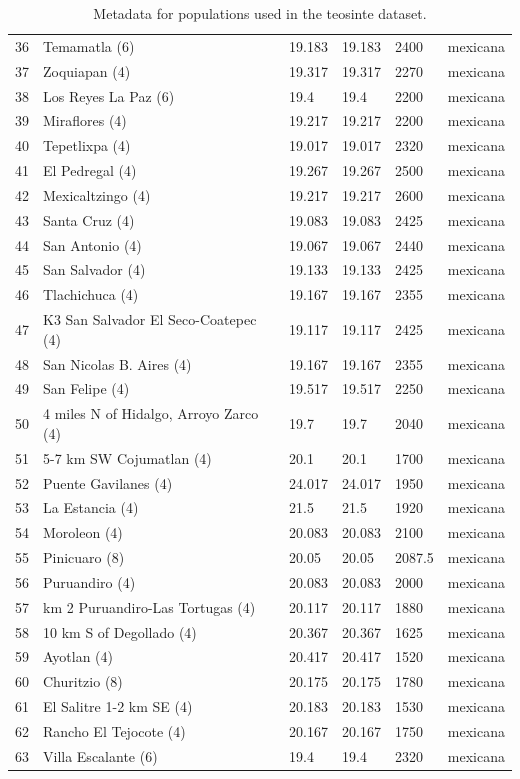 \begin{table}
\begin{center}
{\begin{tabular}{r@{--}lllll}
36 & Temamatla (6) & 19.183 & 19.183 & 2400 & mexicana \\ 
37 & Zoquiapan (4) & 19.317 & 19.317 & 2270 & mexicana \\ 
38 & Los Reyes La Paz (6) & 19.4 & 19.4 & 2200 & mexicana \\ 
39 & Miraflores (4) & 19.217 & 19.217 & 2200 & mexicana \\ 
40 & Tepetlixpa (4) & 19.017 & 19.017 & 2320 & mexicana \\ 
41 & El Pedregal (4) & 19.267 & 19.267 & 2500 & mexicana \\ 
42 & Mexicaltzingo (4) & 19.217 & 19.217 & 2600 & mexicana \\ 
43 & Santa Cruz (4) & 19.083 & 19.083 & 2425 & mexicana \\ 
44 & San Antonio (4) & 19.067 & 19.067 & 2440 & mexicana \\ 
45 & San Salvador (4) & 19.133 & 19.133 & 2425 & mexicana \\ 
46 & Tlachichuca (4) & 19.167 & 19.167 & 2355 & mexicana \\ 
47 & K3 San Salvador El Seco-Coatepec (4) & 19.117 & 19.117 & 2425 & mexicana \\ 
48 & San Nicolas B. Aires (4) & 19.167 & 19.167 & 2355 & mexicana \\ 
49 & San Felipe (4) & 19.517 & 19.517 & 2250 & mexicana \\ 
50 & 4 miles N of Hidalgo, Arroyo Zarco (4) & 19.7 & 19.7 & 2040 & mexicana \\ 
51 & 5-7 km SW Cojumatlan (4) & 20.1 & 20.1 & 1700 & mexicana \\ 
52 & Puente Gavilanes (4) & 24.017 & 24.017 & 1950 & mexicana \\ 
53 & La Estancia (4) & 21.5 & 21.5 & 1920 & mexicana \\ 
54 & Moroleon (4) & 20.083 & 20.083 & 2100 & mexicana \\ 
55 & Pinicuaro (8) & 20.05 & 20.05 & 2087.5 & mexicana \\ 
56 & Puruandiro (4) & 20.083 & 20.083 & 2000 & mexicana \\ 
57 & km 2 Puruandiro-Las Tortugas (4) & 20.117 & 20.117 & 1880 & mexicana \\ 
58 & 10 km S of Degollado (4) & 20.367 & 20.367 & 1625 & mexicana \\ 
59 & Ayotlan (4) & 20.417 & 20.417 & 1520 & mexicana \\ 
60 & Churitzio (8) & 20.175 & 20.175 & 1780 & mexicana \\ 
61 & El Salitre 1-2 km SE (4) & 20.183 & 20.183 & 1530 & mexicana \\ 
62 & Rancho El Tejocote (4) & 20.167 & 20.167 & 1750 & mexicana \\ 
63 & Villa Escalante (6) & 19.4 & 19.4 & 2320 & mexicana \\ 
   \hline
\end{tabular}
}
\label{tab:zea_popdata}
\end{center}
\caption{Metadata for populations used in the teosinte dataset.}
\end{table}


